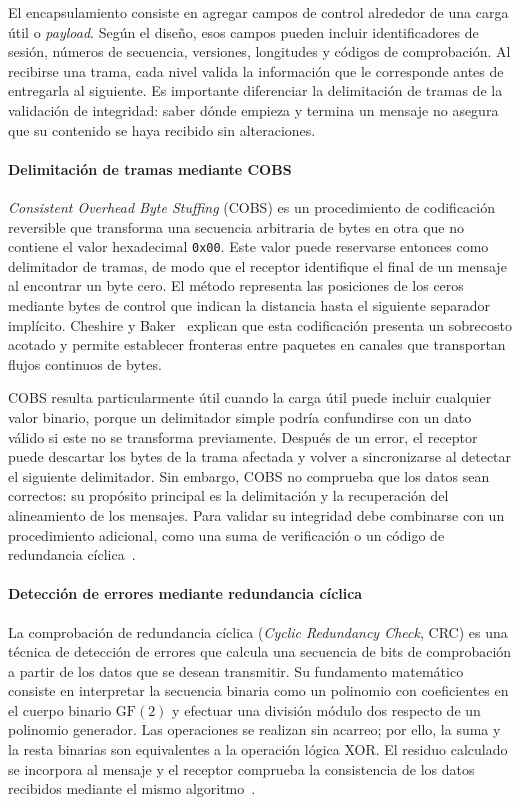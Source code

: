 El encapsulamiento consiste en agregar campos de control alrededor de una carga útil o \textit{payload}. Según el diseño, esos campos pueden incluir identificadores de sesión, números de secuencia, versiones, longitudes y códigos de comprobación. Al recibirse una trama, cada nivel valida la información que le corresponde antes de entregarla al siguiente. Es importante diferenciar la delimitación de tramas de la validación de integridad: saber dónde empieza y termina un mensaje no asegura que su contenido se haya recibido sin alteraciones.

\paragraph{Delimitación de tramas mediante COBS}
\textit{Consistent Overhead Byte Stuffing} (COBS) es un procedimiento de codificación reversible que transforma una secuencia arbitraria de bytes en otra que no contiene el valor hexadecimal \texttt{0x00}. Este valor puede reservarse entonces como delimitador de tramas, de modo que el receptor identifique el final de un mensaje al encontrar un byte cero. El método representa las posiciones de los ceros mediante bytes de control que indican la distancia hasta el siguiente separador implícito. Cheshire y Baker~\cite{cheshire1999cobs} explican que esta codificación presenta un sobrecosto acotado y permite establecer fronteras entre paquetes en canales que transportan flujos continuos de bytes.

COBS resulta particularmente útil cuando la carga útil puede incluir cualquier valor binario, porque un delimitador simple podría confundirse con un dato válido si este no se transforma previamente. Después de un error, el receptor puede descartar los bytes de la trama afectada y volver a sincronizarse al detectar el siguiente delimitador. Sin embargo, COBS no comprueba que los datos sean correctos: su propósito principal es la delimitación y la recuperación del alineamiento de los mensajes. Para validar su integridad debe combinarse con un procedimiento adicional, como una suma de verificación o un código de redundancia cíclica~\cite{cheshire1999cobs}.

\paragraph{Detección de errores mediante redundancia cíclica}
La comprobación de redundancia cíclica (\textit{Cyclic Redundancy Check}, CRC) es una técnica de detección de errores que calcula una secuencia de bits de comprobación a partir de los datos que se desean transmitir. Su fundamento matemático consiste en interpretar la secuencia binaria como un polinomio con coeficientes en el cuerpo binario $\mathrm{GF}(2)$ y efectuar una división módulo dos respecto de un polinomio generador. Las operaciones se realizan sin acarreo; por ello, la suma y la resta binarias son equivalentes a la operación lógica XOR. El residuo calculado se incorpora al mensaje y el receptor comprueba la consistencia de los datos recibidos mediante el mismo algoritmo~\cite{williams1993crc}.

